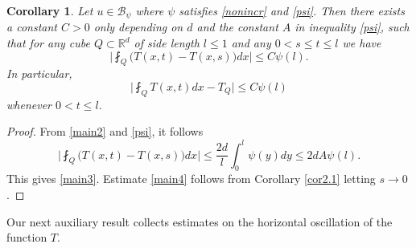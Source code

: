 \documentclass[11pt,letterpaper]{amsart}
\newtheorem{cor}{Corollary}[section]
\theoremstyle{definition}
\numberwithin{equation}{section}
\newcommand{\R}{\mathbb R}
\begin{document}
\begin{cor}\label{corver}
Let $u \in \mathcal{B}_{\psi}$ where $\psi$ satisfies \eqref{nonincr} and \eqref{psi}. Then there exists a constant $C>0$ only depending on $d$ and the constant $A$ in inequality \eqref{psi}, such that for any cube $Q \subset \R^d$  of side length $l \leq 1$ and any $0 < s  \leq  t \leq l $ we have
\begin{equation}\label{main3}
\Big |\fint_Q  \big ( T(x,t) - T(x,s) \big ) dx \Big | \leq C \psi (l). 
\end{equation}
In particular,
\begin{equation}\label{main4}
\big|  \fint_{Q} T(x,t) dx - T_Q \big | \leq C \psi (l)
\end{equation}
whenever $0 < t \leq l$.
 \end{cor}
 \begin{proof}
From \eqref{main2} and \eqref{psi}, it follows
$$
\Big | \fint_Q  \big ( T(x,t) - T(x,s) \big ) dx \Big |  \leq  \frac{2 d}{l}\int_0^l \psi (y) dy \leq 2 d A\psi (l) .
$$
This gives \eqref{main3}. Estimate \eqref{main4} follows from Corollary \ref{cor2.1} letting $s \to 0$.
 \end{proof}

Our next auxiliary result collects estimates on the horizontal oscillation of the function $T$.
\end{document}
